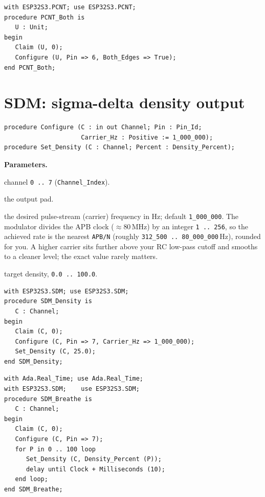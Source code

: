 \begin{lstlisting}
with ESP32S3.PCNT; use ESP32S3.PCNT;
procedure PCNT_Both is
   U : Unit;
begin
   Claim (U, 0);
   Configure (U, Pin => 6, Both_Edges => True);
end PCNT_Both;
\end{lstlisting}

\section{SDM: sigma-delta density output}

\begin{lstlisting}
procedure Configure (C : in out Channel; Pin : Pin_Id;
                     Carrier_Hz : Positive := 1_000_000);
procedure Set_Density (C : Channel; Percent : Density_Percent);
\end{lstlisting}

\textbf{Parameters.}
\begin{description}[style=nextline]
\item[\texttt{Index}] channel \texttt{0\,..\,7} (\texttt{Channel\_Index}).
\item[\texttt{Pin}] the output pad.
\item[\texttt{Carrier\_Hz}] the desired pulse-stream (carrier) frequency in Hz;
  default \texttt{1\_000\_000}. The modulator divides the APB clock
  ($\approx$80\,MHz) by an integer \texttt{1\,..\,256}, so the achieved rate is
  the nearest \texttt{APB/N} (roughly \texttt{312\_500\,..\,80\_000\_000}\,Hz),
  rounded for you. A higher carrier sits further above your RC low-pass cutoff and
  smooths to a cleaner level; the exact value rarely matters.
\item[\texttt{Percent}] target density, \texttt{0.0\,..\,100.0}.
\end{description}

\begin{lstlisting}
with ESP32S3.SDM; use ESP32S3.SDM;
procedure SDM_Density is
   C : Channel;
begin
   Claim (C, 0);
   Configure (C, Pin => 7, Carrier_Hz => 1_000_000);
   Set_Density (C, 25.0);
end SDM_Density;
\end{lstlisting}

\begin{lstlisting}
with Ada.Real_Time; use Ada.Real_Time;
with ESP32S3.SDM;    use ESP32S3.SDM;
procedure SDM_Breathe is
   C : Channel;
begin
   Claim (C, 0);
   Configure (C, Pin => 7);
   for P in 0 .. 100 loop
      Set_Density (C, Density_Percent (P));
      delay until Clock + Milliseconds (10);
   end loop;
end SDM_Breathe;
\end{lstlisting}

